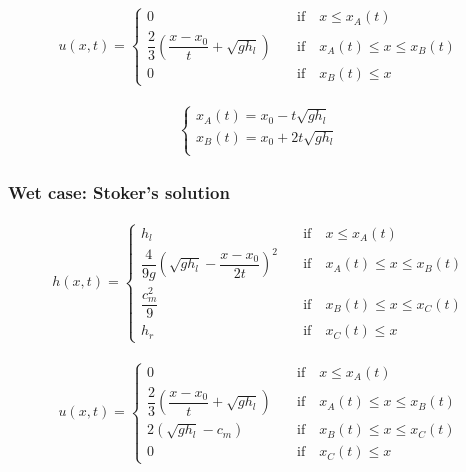 \begin{equation}
\begin{split}u(x,t) = \begin{cases}
0 \quad & \text{if} \quad x \leq x_A(t) \\
\dfrac{2}{3} \left( \dfrac{x-x_0}{t} + \sqrt{gh_l} \right) \quad & \text{if} \quad x_A(t) \leq x \leq x_B(t)\\
0 \quad & \text{if} \quad x_B(t) \leq x
\end{cases}\end{split}
\end{equation}

\begin{equation}
\begin{split}\begin{cases}
x_A(t) = x_0 - t \sqrt{g h_l} \\
x_B(t) = x_0 + 2t \sqrt{gh_l} \\
\end{cases}\end{split}
\end{equation}

\subsubsection{Wet case: Stoker's solution}

\begin{equation}
\begin{split}h(x,t) = \begin{cases}
h_l \quad & \text{if} \quad x \leq x_A(t) \\
\dfrac{4}{9g} \left( \sqrt{gh_l} - \dfrac{x-x_0}{2t} \right)^2 \quad & \text{if} \quad x_A(t) \leq x \leq x_B(t) \\
\dfrac{c_m^2}{9} \quad & \text{if} \quad x_B(t) \leq x \leq x_C(t) \\
h_r \quad & \text{if} \quad x_C(t) \leq x
\end{cases}\end{split}
\end{equation}

\begin{equation}
\begin{split}u(x,t) = \begin{cases}
0 \quad & \text{if} \quad x \leq x_A(t)\\
\dfrac{2}{3} \left( \dfrac{x-x_0}{t} + \sqrt{gh_l} \right) \quad & \text{if} \quad x_A(t) \leq x \leq x_B(t) \\
2 \left( \sqrt{gh_l} - c_m\right) \quad & \text{if} \quad x_B(t) \leq x \leq x_C(t)\\
0 \quad & \text{if} \quad x_C(t) \leq x
\end{cases}\end{split}
\end{equation}

